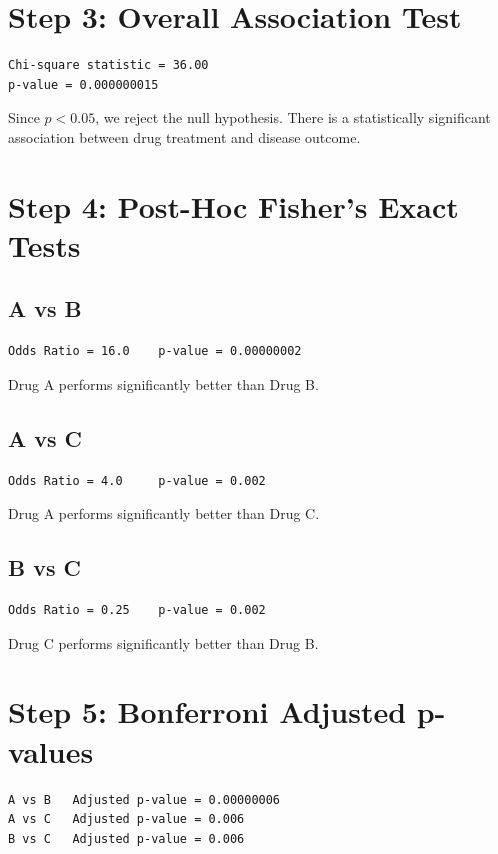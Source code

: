 \documentclass[12pt]{article}
\begin{document}
\section*{Step 3: Overall Association Test}

\begin{verbatim}
Chi-square statistic = 36.00
p-value = 0.000000015
\end{verbatim}

Since $p < 0.05$, we reject the null hypothesis. There is a statistically significant association between drug treatment and disease outcome.

\section*{Step 4: Post-Hoc Fisher's Exact Tests}

\subsection*{A vs B}
\begin{verbatim}
Odds Ratio = 16.0    p-value = 0.00000002
\end{verbatim}
Drug A performs significantly better than Drug B.

\subsection*{A vs C}
\begin{verbatim}
Odds Ratio = 4.0     p-value = 0.002
\end{verbatim}
Drug A performs significantly better than Drug C.

\subsection*{B vs C}
\begin{verbatim}
Odds Ratio = 0.25    p-value = 0.002
\end{verbatim}
Drug C performs significantly better than Drug B.

\section*{Step 5: Bonferroni Adjusted p-values}

\begin{verbatim}
A vs B   Adjusted p-value = 0.00000006
A vs C   Adjusted p-value = 0.006
B vs C   Adjusted p-value = 0.006
\end{verbatim}
\end{document}
